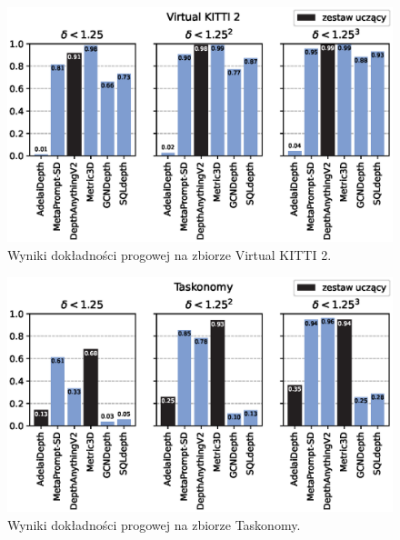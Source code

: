 \begin{figure}[H]
    \centering
    \includegraphics{plots/delta/6}
    \caption{Wyniki dokładności progowej na zbiorze Virtual KITTI 2.}
    \label{fig:delta_6}
\end{figure}
\begin{figure}[H]
    \centering
    \includegraphics{plots/delta/7}
    \caption{Wyniki dokładności progowej na zbiorze Taskonomy.}
    \label{fig:delta_7}
\end{figure}

